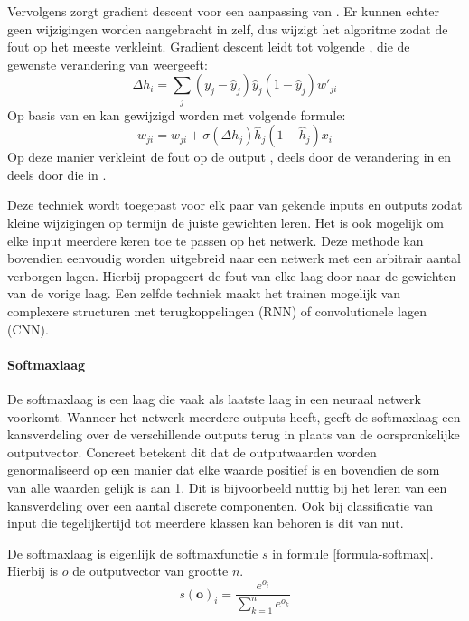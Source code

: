 Vervolgens zorgt gradient descent voor een aanpassing van . Er kunnen echter geen wijzigingen worden aangebracht in  zelf, dus wijzigt het algoritme  zodat de fout op  het meeste verkleint. Gradient descent leidt tot volgende , die de gewenste verandering van  weergeeft:
\begin{equation}
    \Delta h_i = \sum\limits_{j}(y_j-\hat{y}_j)\hat{y}_j(1-\hat{y}_j)w'_{ji}
\end{equation}
Op basis van  en  kan  gewijzigd worden met volgende formule:
\begin{equation}
    w_{ji} = w_{ji} + \sigma(\Delta h_j)\hat{h}_j(1-\hat{h}_j)x_i
\end{equation}
Op deze manier verkleint de fout op de output , deels door de verandering in  en deels door die in . \cite{Blockeel}

Deze techniek wordt toegepast voor elk paar van gekende inputs en outputs zodat kleine wijzigingen op termijn de juiste gewichten leren. Het is ook mogelijk om elke input meerdere keren toe te passen op het netwerk. Deze methode kan bovendien eenvoudig worden uitgebreid naar een netwerk met een arbitrair aantal verborgen lagen. Hierbij propageert de fout van elke laag door naar de gewichten van de vorige laag. Een zelfde techniek maakt het trainen mogelijk van complexere structuren met terugkoppelingen (RNN) of convolutionele lagen (CNN).

\paragraph{Softmaxlaag}\label{par:softmax}
De softmaxlaag is een laag die vaak als laatste laag in een neuraal netwerk voorkomt. Wanneer het netwerk meerdere outputs heeft, geeft de softmaxlaag een kansverdeling over de verschillende outputs terug in plaats van de oorspronkelijke outputvector. Concreet betekent dit dat de outputwaarden worden genormaliseerd op een manier dat elke waarde positief is en bovendien de som van alle waarden gelijk is aan 1. Dit is bijvoorbeeld nuttig bij het leren van een kansverdeling over een aantal discrete componenten. Ook bij classificatie van input die tegelijkertijd tot meerdere klassen kan behoren is dit van nut.

De softmaxlaag is eigenlijk de softmaxfunctie $s$ in formule \eqref{formula-softmax}. Hierbij is $o$ de outputvector van grootte $n$.
\begin{equation}
s(\textbf{o})_i = \frac{e^{o_i}}{\sum^{n}_{k=1}{e^{o_k}}}
\label{formula-softmax}
\end{equation}

